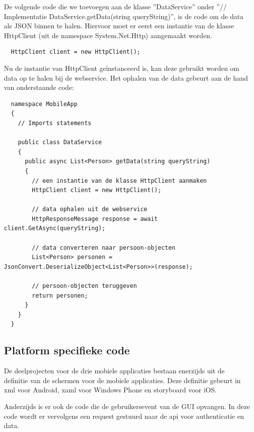De volgende code die we toevoegen aan de klasse ''DataService'' onder ''// Implementatie DataService.getData(string queryString)'', is de code om de data als JSON binnen te halen.
Hiervoor moet er eerst een instantie van de klasse HttpClient (uit de namespace System.Net.Http) aangemaakt worden.
\begin{lstlisting}
  HttpClient client = new HttpClient();
\end{lstlisting}
\newpage
Nu de instantie van HttpClient geïnstanceerd is, kan deze gebruikt worden om data op te halen bij de webservice.
Het ophalen van de data gebeurt aan de hand van onderstaande code:
\begin{lstlisting}
  namespace MobileApp
  {
    // Imports statements

    public class DataService
    {
      public async List<Person> getData(string queryString)
      {
        // een instantie van de klasse HttpClient aanmaken
        HttpClient client = new HttpClient();

        // data ophalen uit de webservice
        HttpResponseMessage response = await client.GetAsync(queryString);

        // data converteren naar persoon-objecten
        List<Person> personen = JsonConvert.DeserializeObject<List<Person>>(response);

        // persoon-objecten teruggeven
        return personen;
      }
    }
  }
\end{lstlisting}



\subsection{Platform specifieke code}
De deelprojecten voor de drie mobiele applicaties bestaan enerzijds uit de definitie van de schermen voor de mobiele applicaties.
Deze definitie gebeurt in xml voor Android, xaml voor Windows Phone en storyboard voor iOS.

Anderzijds is er ook de code die de gebruikersevent van de GUI opvangen. In deze code wordt er vervolgens een request gestuurd naar
de api voor authenticatie en data.
